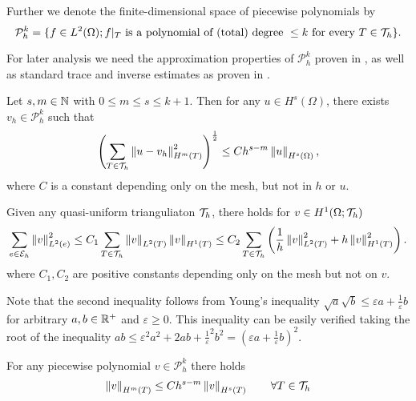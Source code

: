 \begin{definition} \label{def: piecewise polySpace}
	Further we denote the finite-dimensional space of piecewise polynomials by
\[	
	\mathcal P^k_h = \{ f \in L^2(\Omega); f \arrowvert_T \textnormal{ is a polynomial of (total) degree } \leq k \textnormal{ for every } T \in \mathcal{T}_h\}.
\]
\end{definition}

For later analysis we need the approximation properties of $\mathcal P_h^k$ proven in \cite[Chapter 4]{BS2002}, as well as standard trace and inverse estimates as proven in \cite[Section 1.6 and Section 4.5]{BS2002}.
\begin{lemma}  \label{la: approximation properties}
Let $s,m \in \mathbb{N}$ with $0 \leq m \leq s\leq k+1$. Then for any $u \in H^s(\Omega)$, there exists $v_h \in \mathcal P^k_h$ such that 
\[
	\left( \sum_{T \in \mathcal{T}_h} \left\lVert u-v_h \right\rVert^2_{H^m(T)} \right)^{\frac 1 2} \leq C h^{s-m} \left\lVert u \right\rVert_{H^{s}(\Omega)},
\]
where $C$ is a constant depending only on the mesh, but not in $h$ or $u$.
\end{lemma}
\begin{lemma}\label{la: trace estimate}
	Given any quasi-uniform trianguliaton $\mathcal{T}_h$, there holds for $ v \in H^1(\Omega;\mathcal{T}_h)$
	\begin{align*}
	\sum_{e \in \mathcal{E}_h} \left\lVert v \right\rVert_{L^2(e)}^2 
		\leq C_1
		 \sum_{T \in \mathcal{T}_h} \left\lVert v \right\rVert_{L^2(T)} \left\lVert v \right\rVert_{H^1(T)}
	\leq 
		C_2 \sum_{T \in \mathcal{T}_h} \left(\frac 1 {h} \left\lVert v \right\rVert_{L^2(T)}^2  + h \left\lVert v \right\rVert_{H^1(T)}^2\right).
	\end{align*}
	 where $C_1,C_2$ are positive constants depending only on the mesh but not on $v$.
\end{lemma}
Note that the second inequality follows from Young's inequality $\sqrt{a} \sqrt{b} \leq \varepsilon a + \frac 1 \varepsilon b$ for arbitrary $a,b \in \mathbb{R}^+$ and $\varepsilon \geq 0$. This inequality can be easily verified taking the root of the inequality $ab \leq \varepsilon^2 a^2 + 2ab + {\frac 1 \varepsilon}^2b^2 = \left( \varepsilon a + \frac 1 \varepsilon b\right)^2$.

\begin{lemma}\label{la: inverse estimate}
	For any piecewise polynomial $v \in \mathcal P_h^k$ there holds
	\[
	\left\lVert v \right\rVert_{H^m(T)} \leq C h^{s-m} \left\lVert v \right\rVert_{H^s(T)} \qquad \forall T \in \mathcal{T}_h
	\]
\end{lemma}

